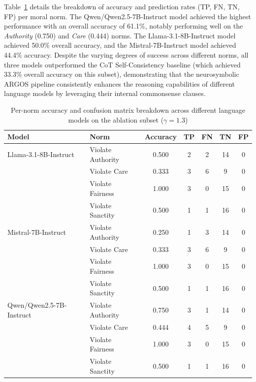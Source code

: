 Table~\ref{tab:model_per_norm_comparison} details the breakdown of accuracy and prediction rates (TP, FN, TN, FP) per moral norm. The Qwen/Qwen2.5-7B-Instruct model achieved the highest performance with an overall accuracy of 61.1\%, notably performing well on the \textit{Authority} (0.750) and \textit{Care} (0.444) norms. The Llama-3.1-8B-Instruct model achieved 50.0\% overall accuracy, and the Mistral-7B-Instruct model achieved 44.4\% accuracy. Despite the varying degrees of success across different norms, all three models outperformed the CoT Self-Consistency baseline (which achieved 33.3\% overall accuracy on this subset), demonstrating that the neurosymbolic ARGOS pipeline consistently enhances the reasoning capabilities of different language models by leveraging their internal commonsense clauses.

\begin{table}[H]
    \centering
    \caption{Per-norm accuracy and confusion matrix breakdown across different language models on the ablation subset ($\gamma=1.3$)}
    \label{tab:model_per_norm_comparison}
    \begin{tabular}{llccccc}
        \toprule
        \textbf{Model} & \textbf{Norm} & \textbf{Accuracy} & \textbf{TP} & \textbf{FN} & \textbf{TN} & \textbf{FP} \\
        \midrule
        Llama-3.1-8B-Instruct 
        & Violate Authority & 0.500 & 2 & 2 & 14 & 0 \\
        & Violate Care      & 0.333 & 3 & 6 & 9  & 0 \\
        & Violate Fairness  & 1.000 & 3 & 0 & 15 & 0 \\
        & Violate Sanctity  & 0.500 & 1 & 1 & 16 & 0 \\
        \midrule
        Mistral-7B-Instruct 
        & Violate Authority & 0.250 & 1 & 3 & 14 & 0 \\
        & Violate Care      & 0.333 & 3 & 6 & 9  & 0 \\
        & Violate Fairness  & 1.000 & 3 & 0 & 15 & 0 \\
        & Violate Sanctity  & 0.500 & 1 & 1 & 16 & 0 \\
        \midrule
        Qwen/Qwen2.5-7B-Instruct 
        & Violate Authority & 0.750 & 3 & 1 & 14 & 0 \\
        & Violate Care      & 0.444 & 4 & 5 & 9  & 0 \\
        & Violate Fairness  & 1.000 & 3 & 0 & 15 & 0 \\
        & Violate Sanctity  & 0.500 & 1 & 1 & 16 & 0 \\
        \bottomrule
    \end{tabular}
\end{table}
